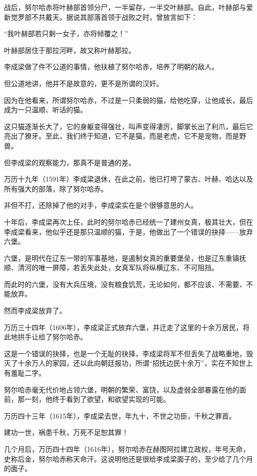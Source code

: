 \begin{multicols}{\theparacolNo}
		战后，努尔哈赤将叶赫部首领分尸，一半留存，一半交叶赫部。自此，叶赫部与爱新觉罗部不共戴天。据说其部落首领于战败之时，曾放言如下：

		“我叶赫部若只剩一女子，亦将倾覆之！”

		叶赫部居住于那拉河畔，故又称叶赫那拉。

		李成梁做了件不公道的事情，他扶植了努尔哈赤，培养了明朝的敌人。

		但公道地讲，他并不是故意的，更不是所谓的汉奸。

		因为在他看来，所谓努尔哈赤，不过是一只柔弱的猫，给他吃穿，让他成长，最后成为一只温顺、听话的猫。

		这只猫逐渐长大了，它的身躯变得强壮，叫声变得凄厉，脚掌长出了利爪，最后它亮出了獠牙。至此，我们终于知道，它不是猫，而是老虎，它不是宠物，而是野兽。

		但李成梁的观察能力，那真不是普通的差。

		万历十九年（1591年）李成梁退休，在此之前，他已打垮了蒙古、叶赫、哈达以及所有强大的部落，除了努尔哈赤。

		非但不打，还除掉了他的对手，李成梁实在是个很够意思的人。

		十年后，李成梁再次上任，此时的努尔哈赤已经统一了建州女真，极其壮大，但在李成梁看来，他似乎还是那只温顺的猫，于是，他做出了一个错误的抉择——放弃六堡。

		六堡，是明代在辽东一带的军事基地，是遏制女真的重要堡垒，也是辽东重镇抚顺、清河的唯一屏障，若丢失此处，女真军队将纵横辽东、不可阻挡。

		而此时的六堡，没有大兵压境，没有粮食饥荒，无论如何，都不应该、不需要、不能放弃。

		然而李成梁放弃了。

		万历三十四年（1606年），李成梁正式放弃六堡，并迁走了这里的十余万居民，将此地拱手让给了努尔哈赤。

		这是一个错误的抉择，也是一个无耻的抉择，李成梁将军不但丢失了战略重地，毁灭了十余万人的家园，还以此向朝廷报功，所谓“招抚边民十余万”，实在不知世上有羞耻二字。

		努尔哈赤毫无代价地占领六堡，明朝的繁荣、富饶，以及虚弱全部暴露在他的面前，那一刻，他终于看到了欲望，和欲望实现的可能。

		万历四十三年（1615年），李成梁去世，年九十，不世之功臣，千秋之罪首。

		建功一世，祸患千秋，万死不足恕其罪！

		几个月后，万历四十四年（1616年），努尔哈赤在赫图阿拉建立政权，年号天命，史称后金，努尔哈赤称天命汗。这说明他还是很给李成梁面子的，至少给了几个月的面子。


\end{multicols}
